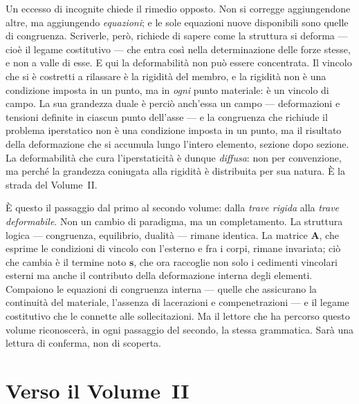 Un eccesso di incognite chiede il rimedio opposto. Non si corregge aggiungendone altre, ma aggiungendo \textit{equazioni}; e le sole equazioni nuove disponibili sono quelle di congruenza. Scriverle, però, richiede di sapere come la struttura si deforma --- cioè il legame costitutivo --- che entra così nella determinazione delle forze stesse, e non a valle di esse. E qui la deformabilità non può essere concentrata. Il vincolo che si è costretti a rilassare è la rigidità del membro, e la rigidità non è una condizione imposta in un punto, ma in \textit{ogni} punto materiale: è un vincolo di campo. La sua grandezza duale è perciò anch'essa un campo --- deformazioni e tensioni definite in ciascun punto dell'asse --- e la congruenza che richiude il problema iperstatico non è una condizione imposta in un punto, ma il risultato della deformazione che si accumula lungo l'intero elemento, sezione dopo sezione. La deformabilità che cura l'iperstaticità è dunque \textit{diffusa}: non per convenzione, ma perché la grandezza coniugata alla rigidità è distribuita per sua natura. È la strada del Volume~II.


È questo il passaggio dal primo al secondo volume: dalla \textit{trave rigida} alla \textit{trave deformabile}. Non un cambio di paradigma, ma un completamento. La struttura logica --- congruenza, equilibrio, dualità --- rimane identica. La matrice $\bm{A}$, che esprime le condizioni di vincolo con l'esterno e fra i corpi, rimane invariata; ciò che cambia è il termine noto $\bm{s}$, che ora raccoglie non solo i cedimenti vincolari esterni ma anche il contributo della deformazione interna degli elementi. Compaiono le equazioni di congruenza interna --- quelle che assicurano la continuità del materiale, l'assenza di lacerazioni e compenetrazioni --- e il legame costitutivo che le connette alle sollecitazioni. Ma il lettore che ha percorso questo volume riconoscerà, in ogni passaggio del secondo, la stessa grammatica. Sarà una lettura di conferma, non di scoperta.




\section*{Verso il Volume~II}

